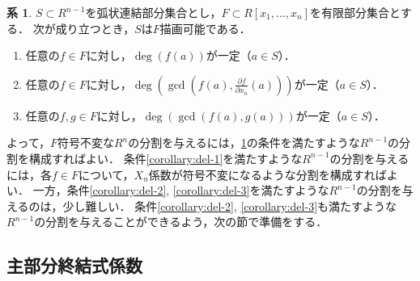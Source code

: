 \documentclass[uplatex, dvipdfmx]{jsarticle}
\numberwithin{equation}{section}
\theoremstyle{definition}
\newtheorem{corollary}[definition]{系}
\begin{document}
\begin{corollary}\label{corollary:del}
     $S \subset R^{n-1}$を弧状連結部分集合とし，$F \subset R[x_1,\dots, x_n]$を有限部分集合とする．
     次が成り立つとき，$S$は$F$描画可能である．
     \begin{enumerate}
          \item \label{corollary:del-1}
          任意の$f \in F$に対し，$\deg(f(a))$が一定（$a \in S$）．
          \item \label{corollary:del-2}
          任意の$f \in F$に対し，$\deg(\gcd(f(a), \frac{\partial f}{\partial x_n}(a)))$が一定（$a \in S$）．
          \item \label{corollary:del-3}
          任意の$f, g \in F$に対し，$\deg(\gcd(f(a), g(a)))$が一定（$a \in S$）．
     \end{enumerate}
\end{corollary}

よって，$F$符号不変な$R^n$の分割を与えるには，\cref{corollary:del}の条件を満たすような$R^{n-1}$の分割を構成すればよい．
条件\ref{corollary:del-1}を満たすような$R^{n-1}$の分割を与えるには，各$f \in F$について，$X_n$係数が符号不変になるような分割を構成すればよい．
一方，条件\ref{corollary:del-2}, \ref{corollary:del-3}を満たすような$R^{n-1}$の分割を与えるのは，少し難しい．
条件\ref{corollary:del-2}, \ref{corollary:del-3}も満たすような$R^{n-1}$の分割を与えることができるよう，次の節で準備をする．

\subsection{主部分終結式係数}

\end{document}

